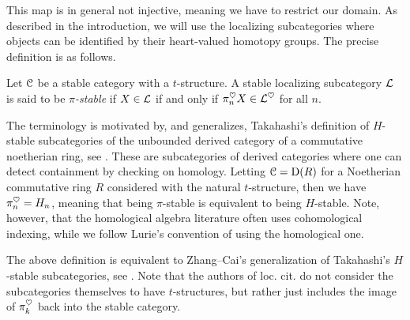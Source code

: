 This map is in general not injective, meaning we have to restrict our domain. As described in the introduction, we will use the localizing subcategories where objects can be identified by their heart-valued homotopy groups. The precise definition is as follows. 

\begin{definition}
    \label{ch3:def:pi-stable-localizing-subcategory}
    Let $\EuScript{C}$ be a stable category with a $t$-structure. A stable localizing subcategory $\mathcal{L}$ is said to be \emph{$\pi$-stable} if $X\in \mathcal{L}$ if and only if $\pi_n^\heartsuit X\in \mathcal{L}^\heartsuit$ for all $n$. 
\end{definition}

\begin{remark}
    The terminology is motivated by, and generalizes, Takahashi's definition of $H$-stable subcategories of the unbounded derived category of a commutative noetherian ring, see \cite[2.11]{takahashi_2009}. These are subcategories of derived categories where one can detect containment by checking on homology. Letting $\EuScript{C}=\mathrm{D}(R)$ for a Noetherian commutative ring $R$ considered with the natural $t$-structure, then we have $\pi_n^\heartsuit = H_n$, meaning that being $\pi$-stable is equivalent to being $H$-stable. Note, however, that the homological algebra literature often uses cohomological indexing, while we follow Lurie's convention of using the homological one. 
\end{remark}

\begin{remark}
    The above definition is equivalent to Zhang--Cai's generalization of Takahashi's $H$-stable subcategories, see \cite{zhang-cai_2017}. Note that the authors of loc. cit. do not consider the subcategories themselves to have $t$-structures, but rather just includes the image of $\pi_k^\heartsuit$ back into the stable category. 
\end{remark}

